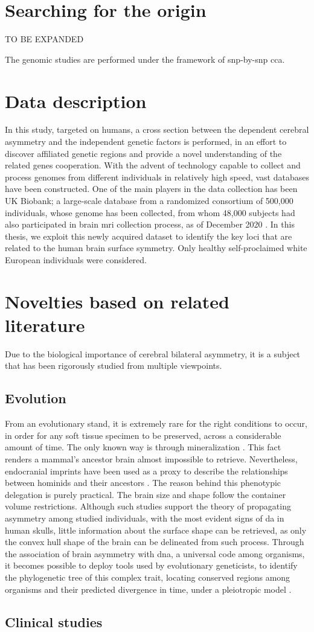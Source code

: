\section{Searching for the origin}
TO BE EXPANDED

The genomic studies are performed under the framework of \ac{snp}-by-\ac{snp} \ac{cca}. 


\section{Data description}
In this study, targeted on humans, a cross section between the dependent cerebral asymmetry and the independent genetic factors is performed, in an effort to discover affiliated genetic regions and provide a novel understanding of the related genes cooperation. With the advent of technology capable to collect and process genomes from different individuals in relatively high speed, vast databases have been constructed. One of the main players in the data collection has been UK Biobank; a large-scale database from a randomized consortium of 500,000 individuals, whose genome has been collected, from whom  48,000 subjects had also participated in brain \ac{mri} collection process, as of December 2020 \cite{Littlejohns2020}. In this thesis, we exploit this newly acquired dataset to identify the key loci that are related to the human brain surface symmetry. Only healthy self-proclaimed white European individuals were considered. 

\section{Novelties based on related literature} 
 Due to the biological importance of cerebral bilateral asymmetry, it is a subject that has been rigorously studied from multiple viewpoints.
 \subsection{Evolution}
 From an evolutionary stand, it is extremely rare for the right conditions to occur, in order for any soft tissue specimen to be preserved, across a considerable amount of time. The only known way is through mineralization \cite{Purnell2018}. This fact renders a mammal's ancestor brain almost impossible to retrieve. Nevertheless, endocranial imprints have been used as a proxy to describe the relationships between hominids and their ancestors \cite{Balzeau2012}\cite{Neubauer2020}. The reason behind this phenotypic delegation is purely practical. The brain size and shape follow the container volume restrictions. Although such studies support the theory of propagating asymmetry among studied individuals, with the most evident signs of \ac{da} in human skulls, little information about the surface shape can be retrieved, as only the convex hull shape of the brain can be delineated from such process. Through the association of brain asymmetry with \acs{dna}, a universal code among organisms, it becomes possible to deploy tools used by evolutionary geneticists, to identify the phylogenetic tree of this complex trait, locating conserved regions among organisms and their predicted divergence in time, under a pleiotropic model \cite{Koch2021}.
 \subsection{Clinical studies}
 